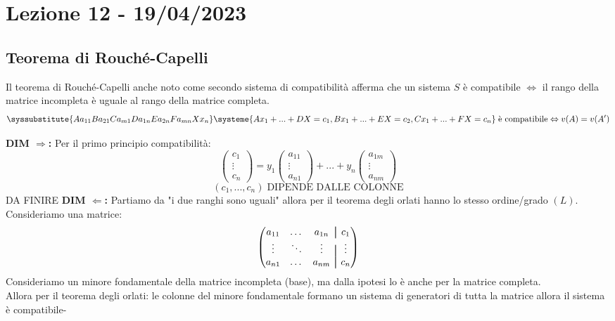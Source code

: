 \section{Lezione 12 - 19/04/2023}

\subsection{Teorema di Rouché-Capelli}
Il teorema di Rouché-Capelli anche noto come secondo sistema di compatibilità afferma che un sistema $S$ è compatibile $\Leftrightarrow$ il rango della matrice incompleta è uguale al rango della matrice completa.
$$
\syssubstitute{A{a_{11}}B{a_{21}}C{a_{m1}}D{a_{1n}}E{a_{2n}}F{a_{mn}}X{x_{n}}}
\systeme{
  A x_1 +...+ D X  = c_1,
  B x_1 +...+ E X = c_2,
  C x_1 +...+ F X = c_n
}
\; \text{è compatibile} \Leftrightarrow
v(A) = v(A^{\prime})
$$

\textbf{DIM $\Rightarrow$:}
Per il primo principio compatibilità:
$$ 
\begin{pmatrix}
c_1 \\ \vdots \\ c_n
\end{pmatrix}
=
y_1 \begin{pmatrix}
a_{11} \\ \vdots \\ a_{n1}
\end{pmatrix}
+...+
y_n \begin{pmatrix}
a_{1m} \\ \vdots \\ a_{nm}
\end{pmatrix}
$$
$$ (c_1,...,c_n) \; \text{DIPENDE DALLE COLONNE}$$
DA FINIRE
\textbf{DIM $\Leftarrow$:}
Partiamo da "i due ranghi sono uguali" allora per il teorema degli orlati hanno lo stesso ordine/grado $(L)$.\\
Consideriamo una matrice:
$$
\begin{pmatrix}
a_{11} & \dots & a_{1n} &\aug& c_1 \\
\vdots & \ddots & \vdots &\aug& \vdots \\
a_{n1} & \dots & a_{nm} &\aug& c_n 
\end{pmatrix}
$$
Consideriamo un minore fondamentale della matrice incompleta (base), ma dalla ipotesi lo è anche per la matrice completa.\\
Allora per il teorema degli orlati: le colonne del minore fondamentale formano un sistema di generatori di tutta la matrice allora il sistema è compatibile-

